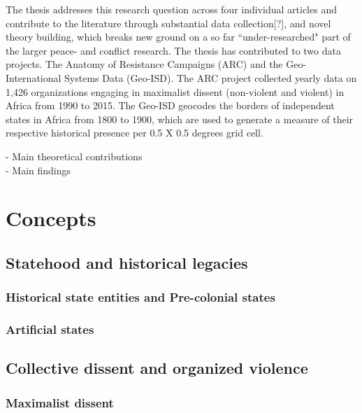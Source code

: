 \documentclass[12pt]{article}
\begin{document}
The thesis addresses this research question across four individual articles and
contribute to the literature through substantial data collection[?], and novel
theory building, which breaks new ground on a so far ``under-researched" part of
the larger peace- and conflict research. The thesis has contributed to two data
projects. The Anatomy of Resistance Campaigns (ARC) and the Geo-International
Systems Data (Geo-ISD). The ARC project collected yearly data on 1,426 organizations
engaging in maximalist dissent (non-violent and violent) in Africa from 1990 to
2015. The Geo-ISD geocodes the borders of independent states in Africa from
1800 to 1900, which are used to generate a measure of their respective
historical presence per 0.5 X 0.5 degrees grid cell. 

- Main theoretical contributions \\
- Main findings

\section{Concepts} \label{Concepts}

\subsection{Statehood and historical legacies} \label{Statehood and historical legacies}

\subsubsection{Historical state entities and Pre-colonial states} \label{Historical state entities and Pre-colonial states}

\subsubsection{Artificial states} \label{Artificial states}

\subsection{Collective dissent and organized violence} \label{Collective dissent and organized violence}

\subsubsection{Maximalist dissent} \label{Maximalist dissent}
\end{document}
